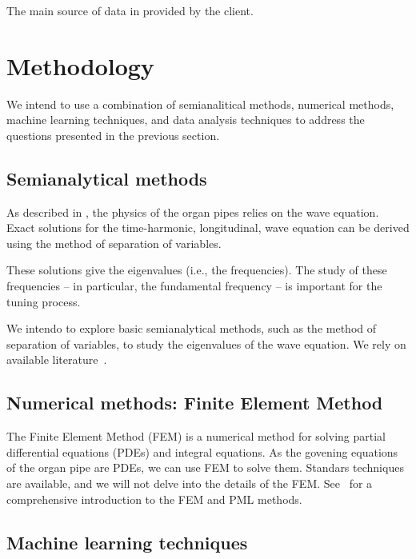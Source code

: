 \documentclass{psu-report}
\begin{document}
The main source of data in provided by the client.

\section{Methodology}

We intend to use a combination of semianalitical methods, numerical methods,
machine learning techniques, and data analysis techniques to address the
questions presented in the previous section.

\subsection{Semianalytical methods}

As described in \autocite{2004RosFle-1}, the physics of the organ pipes relies
on the wave equation.
Exact solutions for the time-harmonic, longitudinal, wave equation can be
derived using the method of separation of variables.

These solutions give the eigenvalues (i.e., the frequencies). 
The study of these frequencies -- in particular, the fundamental
frequency -- is important for the tuning process.

We intendo to explore basic semianalytical methods, such as the method of
separation of variables, to study the eigenvalues of the wave equation.
We rely on available literature~\autocite{2004RosFle-1, 2012RosFle-1}.


\subsection{Numerical methods: Finite Element Method}

The Finite Element Method (FEM) is a numerical method for solving partial
differential equations (PDEs) and integral equations.
As the govening equations of the organ pipe are PDEs, we can use FEM to solve
them.
Standars techniques are available, and we will not delve into the details of the
FEM.
See~\autocite{2021ErnGue-1, 2021ErnGue-2, 2019VazKeeDem-1} for a
comprehensive introduction to the FEM and PML methods.

\subsection{Machine learning techniques}
\end{document}
